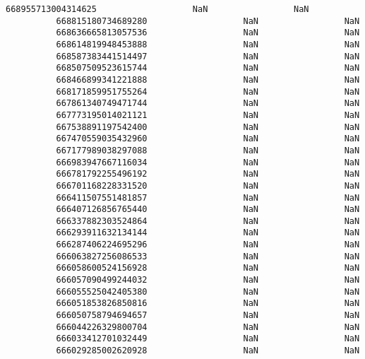 \documentclass[11pt]{article}
\begin{document}
\begin{Verbatim}[commandchars=\\\{\}]
          668955713004314625                   NaN                 NaN   
          668815180734689280                   NaN                 NaN   
          668636665813057536                   NaN                 NaN   
          668614819948453888                   NaN                 NaN   
          668587383441514497                   NaN                 NaN   
          668507509523615744                   NaN                 NaN   
          668466899341221888                   NaN                 NaN   
          668171859951755264                   NaN                 NaN   
          667861340749471744                   NaN                 NaN   
          667773195014021121                   NaN                 NaN   
          667538891197542400                   NaN                 NaN   
          667470559035432960                   NaN                 NaN   
          667177989038297088                   NaN                 NaN   
          666983947667116034                   NaN                 NaN   
          666781792255496192                   NaN                 NaN   
          666701168228331520                   NaN                 NaN   
          666411507551481857                   NaN                 NaN   
          666407126856765440                   NaN                 NaN   
          666337882303524864                   NaN                 NaN   
          666293911632134144                   NaN                 NaN   
          666287406224695296                   NaN                 NaN   
          666063827256086533                   NaN                 NaN   
          666058600524156928                   NaN                 NaN   
          666057090499244032                   NaN                 NaN   
          666055525042405380                   NaN                 NaN   
          666051853826850816                   NaN                 NaN   
          666050758794694657                   NaN                 NaN   
          666044226329800704                   NaN                 NaN   
          666033412701032449                   NaN                 NaN   
          666029285002620928                   NaN                 NaN   
          

\end{Verbatim}
\end{document}
